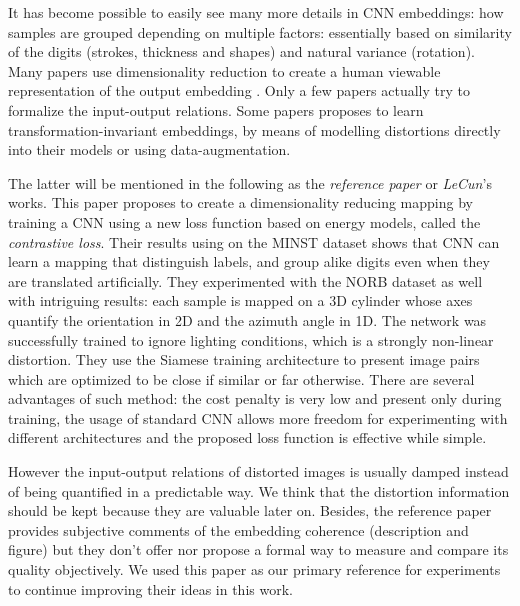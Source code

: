 \documentclass[a4paper,12pt]{report}
\begin{document}
It has become possible to easily see many more details in CNN embeddings: how samples are grouped depending on multiple factors: essentially based on similarity of the digits (strokes, thickness and shapes) and natural variance (rotation).
Many papers use dimensionality reduction to create a human viewable representation of the output embedding \cite{donahue2013decaf}\cite{yu2014visualizing}\cite{yaotiny}.
Only a few papers actually try to formalize the input-output relations\cite{goodfellow2009measuring}.
Some papers proposes to learn transformation-invariant embeddings, by means of modelling distortions directly into their models\cite{gens2014deep} or using data-augmentation\cite{hadsell2006dimensionality}.

The latter will be mentioned in the following as the {\em reference paper} or {\em LeCun}'s works.
This paper proposes to create a dimensionality reducing mapping by training a CNN using a new loss function based on energy models, called the {\em contrastive loss}.
Their results using on the MINST dataset\cite{lecun1998mnist} shows that CNN can learn a mapping that distinguish labels, and group alike digits even when they are translated artificially.
They experimented with the NORB dataset\cite{lecun2004learning} as well with intriguing results: each sample is mapped on a 3D cylinder whose axes quantify the orientation in 2D and the azimuth angle in 1D.
The network was successfully trained to ignore lighting conditions, which is a strongly non-linear distortion.
They use the Siamese training architecture to present image pairs which are optimized to be close if similar or far otherwise\cite{bromley1993signature}\cite{chopra2005learning}.
There are several advantages of such method: the cost penalty is very low and present only during training, the usage of standard CNN allows more freedom for experimenting with different architectures and the proposed loss function is effective while simple.

However the input-output relations of distorted images is usually damped instead of being quantified in a predictable way.
We think that the distortion information should be kept because they are valuable later on.
Besides, the reference paper provides subjective comments of the embedding coherence (description and figure) but they don't offer nor propose a formal way to measure and compare its quality objectively.
We used this paper as our primary reference for experiments to continue improving their ideas in this work.
\end{document}
